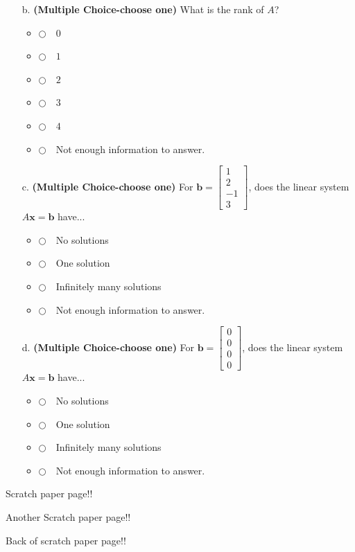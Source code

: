 \documentclass[12pt]{extarticle}
\newcommand{\chooseone}{{\Large$\Circle$\ \ }}
\begin{document}
\begin{enumerate}
\begin{itemize}
     \vfill

     \item[b.] \textbf{(Multiple Choice-choose one)}  What is the rank of $A$?
\begin{itemize}[label={}]
\item \chooseone $0$
\item \chooseone $1$
\item \chooseone $2$
\item \chooseone $3$
\item \chooseone $4$
\item \chooseone Not enough information to answer.
\end{itemize}  
     \vfill


     \item[c.] \textbf{(Multiple Choice-choose one)} For $\mathbf{b}=\begin{bmatrix} 1 \\ 2\\ -1 \\ 3\end{bmatrix}$, does the linear system $A\mathbf{x}=\mathbf{b}$ have...
\begin{itemize}[label={}]
\item \chooseone No solutions
\item \chooseone One solution
\item \chooseone Infinitely many solutions
\item \chooseone Not enough information to answer.
\end{itemize}    
     
     \vfill


\item[d.] \textbf{(Multiple Choice-choose one)} For $\mathbf{b}=\begin{bmatrix} 0 \\ 0\\ 0 \\ 0\end{bmatrix}$, does the linear system $A\mathbf{x}=\mathbf{b}$ have...
\begin{itemize}[label={}]
\item \chooseone No solutions
\item \chooseone One solution
\item \chooseone Infinitely many solutions
\item \chooseone Not enough information to answer.
\end{itemize}    
\end{itemize}


    
    





    


\newpage


    


    

    
    
    
        \newpage
\end{enumerate}

\newpage
Scratch paper page!!


\newpage


Another Scratch paper page!!

\newpage

Back of scratch paper page!!
\end{document}
